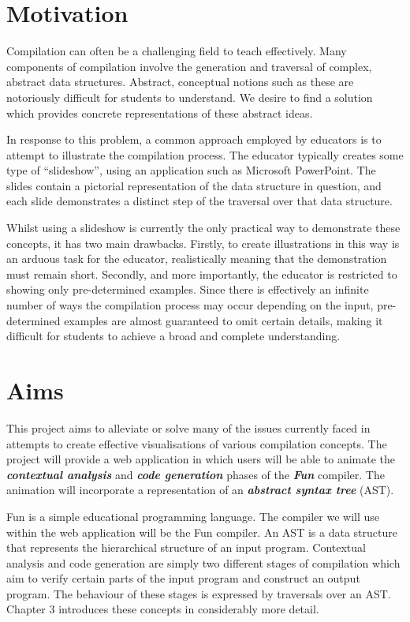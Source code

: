 \documentclass{l4proj}
\begin{document}
\section{Motivation}
Compilation can often be a challenging field to teach effectively. Many components of compilation involve the generation and traversal of complex, abstract data structures. Abstract, conceptual notions such as these are notoriously difficult for students to understand. We desire to find a solution which provides concrete representations of these abstract ideas.

In response to this problem, a common approach employed by educators is to attempt to illustrate the compilation process. The educator typically creates some type of ``slideshow'', using an application such as Microsoft PowerPoint. The slides contain a pictorial representation of the data structure in question, and each slide demonstrates a distinct step of the traversal over that data structure. 

Whilst using a slideshow is currently the only practical way to demonstrate these concepts, it has two main drawbacks. Firstly, to create illustrations in this way is an arduous task for the educator, realistically meaning that the demonstration must remain short. Secondly, and more importantly, the educator is restricted to showing only pre-determined examples. Since there is effectively an infinite number of ways the compilation process may occur depending on the input, pre-determined examples are almost guaranteed to omit certain details, making it difficult for students to achieve a broad and complete understanding.

\section{Aims}
This project aims to alleviate or solve many of the issues currently faced in attempts to create effective visualisations of various compilation concepts. The project will provide a web application in which users will be able to animate the \textit{\textbf{contextual analysis}} and \textit{\textbf{code generation}} phases of the \textit{\textbf{Fun}} compiler. The animation will incorporate a representation of an \textit{\textbf{abstract syntax tree}} (AST). 

Fun is a simple educational programming language. The compiler we will use within the web application will be the Fun compiler. An AST is a data structure that represents the hierarchical structure of an input program. Contextual analysis and code generation are simply two different stages of compilation which aim to verify certain parts of the input program and construct an output program. The behaviour of these stages is expressed by traversals over an AST. Chapter 3 introduces these concepts in considerably more detail.
\end{document}
